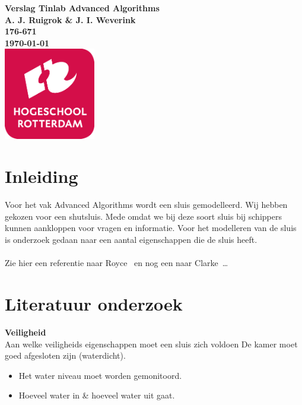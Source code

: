 \documentclass{article}
\begin{document}
\sffamily
\begin{titlepage}
  \centering
    \vfill
    {\bfseries\Huge
      Verslag Tinlab Advanced Algorithms \\
        \vskip2cm
      }
      {\bfseries\Large
        A. J. Ruigrok \& J. I. Weverink\\
      }
      {
        \bfseries\normalsize
        176-671\\
        \vskip1cm
        \today\\
    }
    \vfill
    \includegraphics[width=4cm]{logohr.png} %
    \vfill
    \vfill
\end{titlepage}
\newpage
\tableofcontents

\newpage
\section{Inleiding}
Voor het vak Advanced Algorithms wordt een sluis gemodelleerd. Wij hebben gekozen voor een shutsluis. Mede omdat we bij deze soort sluis bij schippers kunnen aankloppen voor vragen en informatie. Voor het modelleren van de sluis is onderzoek gedaan naar een aantal eigenschappen die de sluis heeft.
\\\\
Zie hier een referentie naar Royce~\cite{royce1987managing} en nog een naar Clarke~\cite{modelchecking}\ldots 

\section{Literatuur onderzoek} %
\textbf{Veiligheid}\\
Aan welke veiligheids eigenschappen moet een sluis zich voldoen
De kamer moet goed afgesloten zijn (waterdicht).
\begin{itemize}
\item Het water niveau moet worden gemonitoord.
\item Hoeveel water in \& hoeveel water uit gaat.
\end{itemize}
\end{document}
